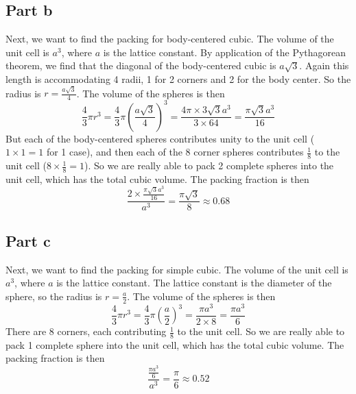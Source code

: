 \documentclass[12pt]{article}
\begin{document}
\subsection{Part b}
Next, we want to find the packing for body-centered cubic. The volume of the unit cell is \(a^3\), where \(a\) is the lattice constant. By application of the Pythagorean theorem, we find that the diagonal of the body-centered cubic is \(a\sqrt{3}\). Again this length is accommodating 4 radii, 1 for 2 corners and 2 for the body center. So the radius is \(r = \frac{a\sqrt{3}}{4}\). The volume of the spheres is then
\begin{equation}
    \frac{4}{3}\pi r^3 = \frac{4}{3}\pi \left(\frac{a\sqrt{3}}{4}\right)^3 = \frac{4\pi \times 3\sqrt{3}a^3}{3 \times 64} = \frac{\pi\sqrt{3}a^3}{16}
\end{equation}
But each of the body-centered spheres contributes unity to the unit cell ($1 \times 1 = 1$ for 1 case), and then each of the 8 corner spheres contributes \(\frac{1}{8}\) to the unit cell ($8 \times \frac{1}{8} = 1$). So we are really able to pack 2 complete spheres into the unit cell, which has the total cubic volume. The packing fraction is then
\begin{equation}
    \frac{2 \times \frac{\pi\sqrt{3}a^3}{16}}{a^3} = \frac{\pi\sqrt{3}}{8} \approx 0.68
\end{equation}
\subsection{Part c}
Next, we want to find the packing for simple cubic. The volume of the unit cell is \(a^3\), where \(a\) is the lattice constant. The lattice constant is the diameter of the sphere, so the radius is \(r = \frac{a}{2}\). The volume of the spheres is then
\begin{equation}
    \frac{4}{3}\pi r^3 = \frac{4}{3}\pi \left(\frac{a}{2}\right)^3 = \frac{\pi a^3}{2 \times 8} = \frac{\pi a^3}{6}
\end{equation}
There are 8 corners, each contributing \(\frac{1}{8}\) to the unit cell. So we are really able to pack 1 complete sphere into the unit cell, which has the total cubic volume. The packing fraction is then
\begin{equation}
    \frac{\frac{\pi a^3}{6}}{a^3} = \frac{\pi}{6} \approx 0.52
\end{equation}
\end{document}
